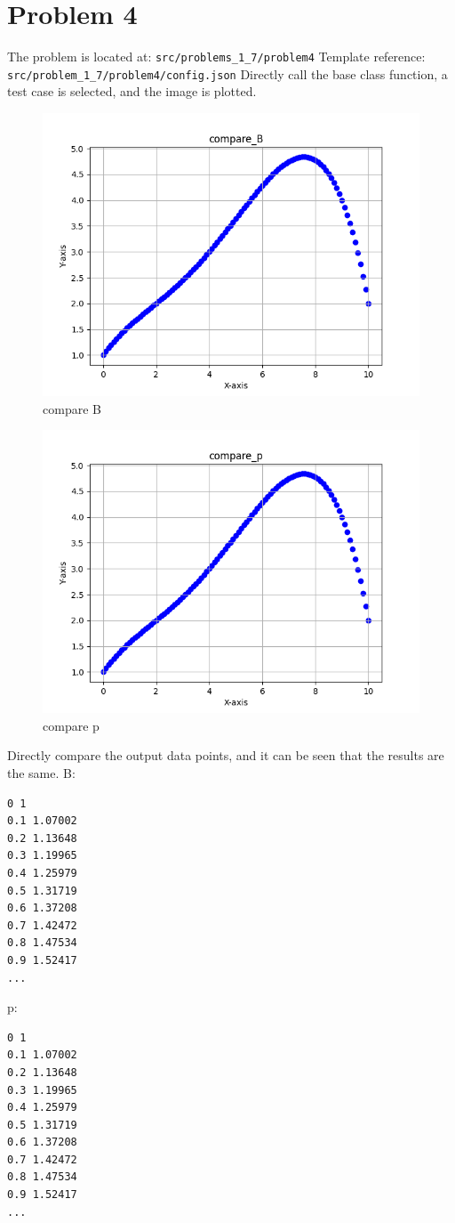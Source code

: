 \documentclass[a4paper]{article}
\begin{document}
\section*{Problem 4}
The problem is located at: \texttt{src/problems\_1\_7/problem4}
Template reference: \texttt{src/problem\_1\_7/problem4/config.json}
Directly call the base class function, a test case is selected, and the image is plotted.
\begin{figure}[H] 
    \centering
    \includegraphics{../figure/compare_B.png} 
    \caption{compare B} 
\end{figure}

\begin{figure}[H] 
    \centering
    \includegraphics{../figure/compare_p.png} 
    \caption{compare p} 
\end{figure}
Directly compare the output data points, and it can be seen that the results are the same.
B:
\begin{verbatim}
0 1
0.1 1.07002
0.2 1.13648
0.3 1.19965
0.4 1.25979
0.5 1.31719
0.6 1.37208
0.7 1.42472
0.8 1.47534
0.9 1.52417
...
\end{verbatim}
p:
\begin{verbatim}
0 1
0.1 1.07002
0.2 1.13648
0.3 1.19965
0.4 1.25979
0.5 1.31719
0.6 1.37208
0.7 1.42472
0.8 1.47534
0.9 1.52417
...
\end{verbatim}
\end{document}
